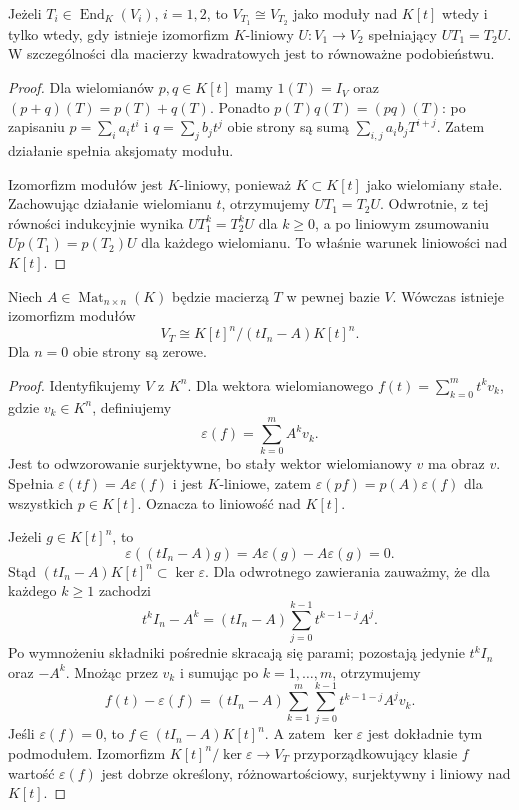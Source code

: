 \begin{stwierdzenie}
\label{prop:lin19-module-similarity}
Jeżeli \(T_i\in\operatorname{End}_K(V_i)\),
\(i=1,2\), to \(V_{T_1}\cong V_{T_2}\)
jako moduły nad \(K[t]\) wtedy i tylko wtedy,
gdy istnieje izomorfizm \(K\)-liniowy
\(U\colon V_1\to V_2\) spełniający
\(UT_1=T_2U\).
W szczególności dla macierzy kwadratowych
jest to równoważne podobieństwu.
\end{stwierdzenie}
\begin{proof}
Dla wielomianów \(p,q\in K[t]\)
mamy \(1(T)=I_V\) oraz
\((p+q)(T)=p(T)+q(T)\).
Ponadto \(p(T)q(T)=(pq)(T)\):
po zapisaniu \(p=\sum_i a_it^i\)
i \(q=\sum_jb_jt^j\)
obie strony są sumą
\(\sum_{i,j}a_ib_jT^{i+j}\).
Zatem działanie spełnia aksjomaty modułu.

Izomorfizm modułów jest \(K\)-liniowy,
ponieważ \(K\subset K[t]\) jako wielomiany stałe.
Zachowując działanie wielomianu \(t\),
otrzymujemy \(UT_1=T_2U\).
Odwrotnie, z tej równości indukcyjnie
wynika \(UT_1^k=T_2^kU\) dla \(k\ge0\),
a po liniowym zsumowaniu
\(Up(T_1)=p(T_2)U\) dla każdego wielomianu.
To właśnie warunek liniowości nad \(K[t]\).
\end{proof}

\begin{twierdzenie}
\label{thm:lin19-presentation}
Niech \(A\in\operatorname{Mat}_{n\times n}(K)\)
będzie macierzą \(T\) w pewnej bazie \(V\).
Wówczas istnieje izomorfizm modułów
\[
 V_T\cong K[t]^n/(tI_n-A)K[t]^n.
\]
Dla \(n=0\) obie strony są zerowe.
\end{twierdzenie}
\begin{proof}
Identyfikujemy \(V\) z \(K^n\).
Dla wektora wielomianowego
\(f(t)=\sum_{k=0}^{m}t^kv_k\),
gdzie \(v_k\in K^n\), definiujemy
\[
 \varepsilon(f)=\sum_{k=0}^{m}A^kv_k.
\]
Jest to odwzorowanie surjektywne,
bo stały wektor wielomianowy \(v\)
ma obraz \(v\).
Spełnia \(\varepsilon(tf)=A\varepsilon(f)\)
i jest \(K\)-liniowe, zatem
\(\varepsilon(pf)=p(A)\varepsilon(f)\)
dla wszystkich \(p\in K[t]\).
Oznacza to liniowość nad \(K[t]\).

Jeżeli \(g\in K[t]^n\), to
\[
 \varepsilon((tI_n-A)g)
 =A\varepsilon(g)-A\varepsilon(g)=0.
\]
Stąd \((tI_n-A)K[t]^n\subset\ker\varepsilon\).
Dla odwrotnego zawierania zauważmy, że
dla każdego \(k\ge1\) zachodzi
\[
 t^kI_n-A^k
  =(tI_n-A)\sum_{j=0}^{k-1}t^{k-1-j}A^j.
\]
Po wymnożeniu składniki pośrednie
skracają się parami; pozostają
jedynie \(t^kI_n\) oraz \(-A^k\).
Mnożąc przez \(v_k\) i sumując
po \(k=1,\ldots,m\), otrzymujemy
\[
 f(t)-\varepsilon(f)
 =(tI_n-A)\sum_{k=1}^{m}\sum_{j=0}^{k-1}
          t^{k-1-j}A^jv_k.
\]
Jeśli \(\varepsilon(f)=0\),
to \(f\in(tI_n-A)K[t]^n\).
A zatem \(\ker\varepsilon\)
jest dokładnie tym podmodułem.
Izomorfizm \(K[t]^n/\ker\varepsilon\to V_T\)
przyporządkowujący klasie \(f\)
wartość \(\varepsilon(f)\) jest
dobrze określony, różnowartościowy,
surjektywny i liniowy nad \(K[t]\).
\end{proof}

